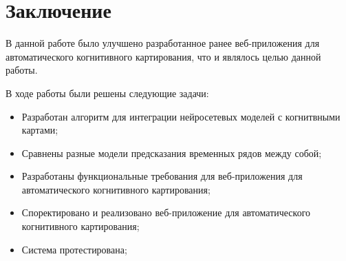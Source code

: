 \chapter*{Заключение}

В данной работе было улучшено разработанное ранее
веб-приложения для автоматического когнитивного картирования,
что и являлось целью данной работы.

В ходе работы были решены следующие задачи:

\begin{itemize}
	\item Разработан алгоритм для интеграции нейросетевых моделей с когнитвными картами;
	\item Сравнены разные модели предсказания временных рядов между собой;
	\item Разработаны функциональные требования для веб-приложения для автоматического когнитивного картирования;
	\item Споректировано и реализовано веб-приложение для автоматического когнитивного картирования;
	\item Система протестирована;
\end{itemize}




